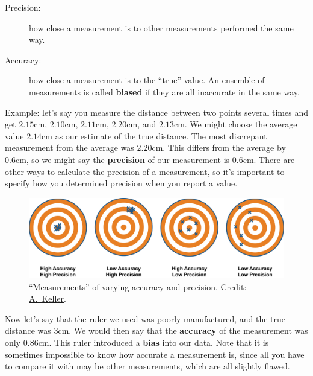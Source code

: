 \documentclass[11pt]{article}%
\begin{document}
\begin{description}
\item[Precision:] how close a measurement is to other measurements
performed the same way.
\item[Accuracy:] how close a measurement is to the ``true'' value.
    An ensemble of measurements is called \textbf{biased}
    if they are all inaccurate in the same way.
\end{description}

Example: let's say you measure the distance between two points several times
and get $2.15\mathrm{cm}$, $2.10\mathrm{cm}$, $2.11\mathrm{cm}$,
$2.20\mathrm{cm}$, and $2.13\mathrm{cm}$.
We might choose the average value $2.14\mathrm{cm}$ as our estimate of the true
distance.
The most discrepant measurement from the average was $2.20\mathrm{cm}$. This
differs from the average by $0.6\mathrm{cm}$, so we might say the {\bf
precision} of our measurement is $0.6\mathrm{cm}$.
There are other ways to calculate the precision of a measurement, so it's
important to specify how you determined precision when you report a value.

\begin{figure}[h!]
\begin{centering}
\includegraphics[width=\columnwidth]{acc_prec.jpeg}
\caption{``Measurements'' of varying accuracy and precision.
Credit:
\href{http://kaffee.50webs.com/Science/images/Accuracy-vs-precision1.jpg}{A.~Keller}.
}
\end{centering}
\end{figure}

Now let's say that the ruler we used was poorly manufactured, and the
true distance was $3\mathrm{cm}$. We would then say that the {\bf accuracy}
of the measurement was only $0.86\mathrm{cm}$. This ruler introduced a {\bf bias} into our data.
Note that it is sometimes
impossible to know how accurate a measurement is, since all you have
to compare it with may be other measurements, which are all slightly flawed.
\end{document}
